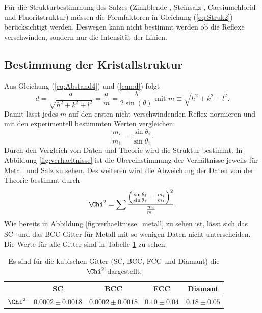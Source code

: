 Für die Strukturbestimmung des Salzes (Zinkblende-, Steinsalz-, Caesiumchlorid- und Fluoritstruktur) müssen die Formfaktoren in Gleichung (\ref{eq:Struk2}) berücksichtigt werden. Deswegen kann nicht bestimmt werden ob die Reflexe verschwinden, sondern nur die Intensität der Linien.

\subsection{Bestimmung der Kristallstruktur}

Aus Gleichung (\ref{eq:Abstand4}) und (\ref{eqn:d}) folgt
\begin{equation*}
	d = \frac{a}{\sqrt{h^2 + k ^2 + l^2}} = \frac{a}{m} = \frac{\lambda}{2\sin(\theta)} \text{ mit }m\equiv\sqrt{h^2 + k ^2 + l^2}.
\end{equation*}
Damit lässt jedes $m$ auf den ersten nicht verschwindenden Reflex normieren und mit den experimentell bestimmten Werten vergleichen:
\begin{equation*}
	\frac{m_i}{m_1} = \frac{\sin{\theta_i}}{\sin{\theta_1}}.
\end{equation*}
Durch den Vergleich von Daten und Theorie wird die Struktur bestimmt. In Abbildung \ref{fig:verhaeltnisse} ist die Übereinstimmung der Verhältnisse jeweils für Metall und Salz zu sehen. Des weiteren wird die Abweichung der Daten von der Theorie bestimmt durch
\begin{equation*}
	\Chi^2 = \sum\frac{\left(\frac{\sin{\theta_i}}{\sin{\theta_1}} - \frac{m_i}{m_1}\right)^2}{\frac{m_i}{m_1}}.
\end{equation*}
Wie bereits in Abbildung \ref{fig:verhaeltnisse_metall} zu sehen ist, lässt sich das SC- und das BCC-Gitter für Metall mit so wenigen Daten nicht unterscheiden. Die Werte für alle Gitter sind in Tabelle \ref{tab:Xi} zu sehen.
%
\begin{table}[h]
\centering
\caption{Es sind für die kubischen Gitter (SC, BCC, FCC und Diamant) die $\Chi^2$ dargestellt.}
\label{tab:Xi}
\begin{tabular}{c | c | c | c | c}
		\hline
		& SC & BCC & FCC & Diamant \\
		\hline
		$\Chi^2$ & $0.0002\pm0.0018$ & $0.0002\pm0.0018$ & $0.10\pm0.04$ & $0.18\pm0.05$ \\
		\hline
\end{tabular}
\end{table}
%
